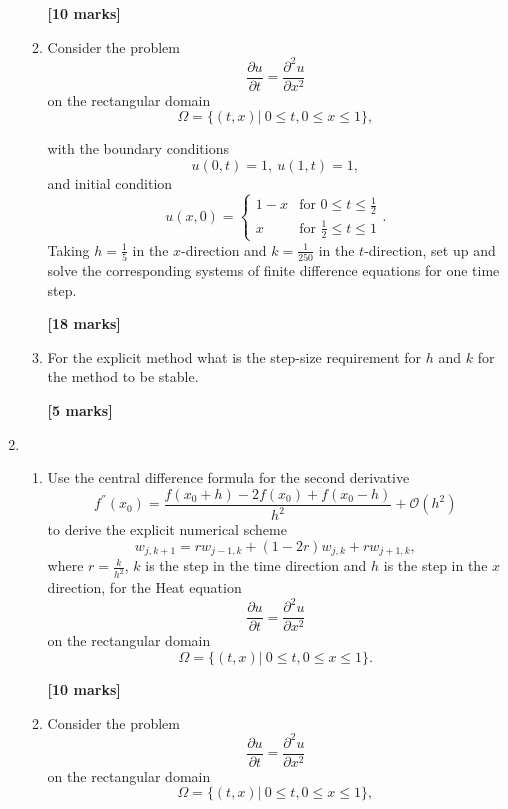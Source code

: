 \begin{enumerate}
\begin{enumerate}
\begin{flushright}
\textbf{[10 marks]}
\end{flushright}
	
	\item Consider the problem
	\[\frac{\partial u}{\partial t}=\frac{\partial^2 u}{\partial x^2} \]
	on the rectangular domain
		\[\Omega=\{(t,x)| \ 0\leq t, 0 \leq x \leq 1\}, \]

	with the boundary conditions
	\[ u(0,t)=1, \ u(1,t)=1,   \]
	and initial condition
	\[	u(x,0)=\begin{cases}
	1-x & \text{for }0\leq t \leq \frac{1}{2}\\
	x & \text{for } \frac{1}{2}\leq t \leq 1
	\end{cases}. \]
		Taking $h=\frac{1}{5}$ in the $x$-direction and $k=\frac{1}{250}$ in the $t$-direction, set up and solve the corresponding systems of finite difference equations for one time step.\\
\begin{flushright}
\textbf{[18 marks]}
\end{flushright}
	\item
	For the explicit method what is the step-size requirement for $h$ and $k$ for the method to be stable.
\begin{flushright}
\textbf{[5 marks]}
\end{flushright}
	
	
\end{enumerate}

	\item 
\begin{enumerate}
	
	\item 
	Use the central difference formula for the second derivative 
	\[ f^{''}(x_0)=\frac{f(x_0+h)-2f(x_0)+f(x_0-h)}{h^2}+\mathcal{O}(h^2)\]
	to derive the explicit numerical scheme
	\[w_{j,k+1}=rw_{j-1,k}+(1-2r)w_{j,k}+rw_{j+1,k},\]
	where $r=\frac{k}{h^2}$, $k$ is the step in the time direction and $h$ is the step in the $x$ direction, 
	for the Heat equation 
	\[\frac{\partial u}{\partial t}=\frac{\partial^2 u}{\partial x^2} \]
	on the rectangular domain
	\[\Omega=\{(t,x)| \ 0\leq t, 0 \leq x \leq 1\}. \]

\begin{flushright}
\textbf{[10 marks]}
\end{flushright}
	
	\item Consider the problem
	\[\frac{\partial u}{\partial t}=\frac{\partial^2 u}{\partial x^2} \]
	on the rectangular domain
	\[\Omega=\{(t,x)| \ 0\leq t, 0 \leq x \leq 1\}, \]


\end{enumerate}
\end{enumerate}
